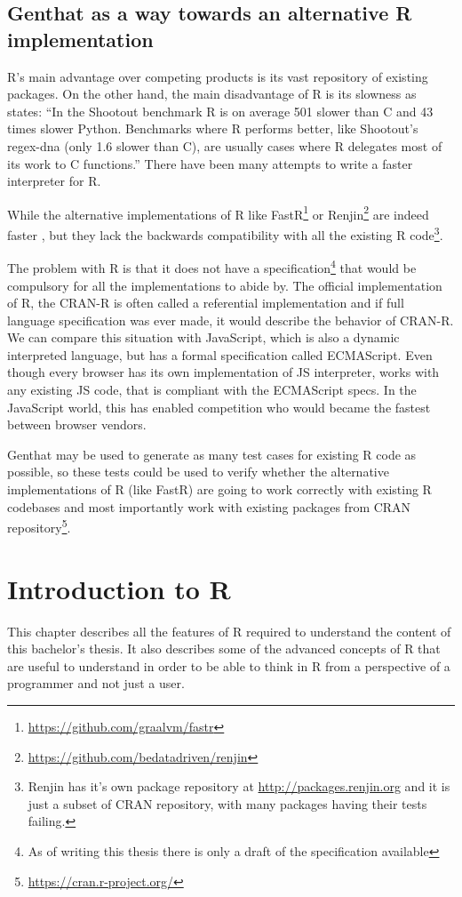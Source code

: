 \documentclass[thesis=B,english]{FITthesis}[2012/10/20]
\begin{document}
\section{Genthat as a way towards an alternative R implementation}
R’s main advantage over competing products is its vast repository of existing packages. On the other hand, the main disadvantage of R is its slowness as \cite{vitek} states: ``In the Shootout benchmark R is on average 501 slower than C and 43 times slower Python. Benchmarks where R performs better, like Shootout’s regex-dna (only 1.6 slower than C), are usually cases where R delegates most of its work to C functions.'' There have been many attempts to write a faster interpreter for R.

While the alternative implementations of R like FastR\footnote{\url{https://github.com/graalvm/fastr}} or Renjin\footnote{\url{https://github.com/bedatadriven/renjin}} are indeed faster \cite{renjin}, but they lack the backwards compatibility with all the existing R code\footnote{Renjin has it's own package repository at \url{http://packages.renjin.org} and it is just a subset of CRAN repository, with many packages having their tests failing.}. 

The problem with R is that it does not have a specification\footnote{As of writing this thesis there is only a draft of the specification available} that would be compulsory for all the implementations to abide by. The official implementation of R, the CRAN-R is often called a referential implementation and if full language specification was ever made, it would describe the behavior of CRAN-R. We can compare this situation with JavaScript, which is also a dynamic interpreted language, but has a formal specification called ECMAScript\cite{EcmaScript}. Even though every browser has its own implementation of JS interpreter, works with any existing JS code, that is compliant with the ECMAScript specs. In the JavaScript world, this has enabled competition who would became the fastest between browser vendors. 

Genthat may be used to generate as many test cases for existing R code as possible, so these tests could be used to verify whether the alternative implementations of R (like FastR) are going to work correctly with existing R codebases and most importantly work with existing packages from CRAN repository\footnote{\url{https://cran.r-project.org/}}\cite{testRPoster}.


\chapter{Introduction to R} \label{chap:R}
This chapter describes all the features of R required to understand the content of this bachelor’s thesis. It also describes some of the advanced concepts of R that are useful to understand in order to be able to think in R from a perspective of a programmer and not just a user.
\end{document}
